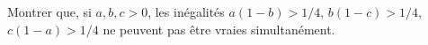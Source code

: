Montrer que, si $a, b, c > 0$, les inégalités $a(1 - b) > 1/4$, $b(1 - c) > 1/4$, $c(1 - a) > 1/4$ ne peuvent pas être vraies simultanément.
